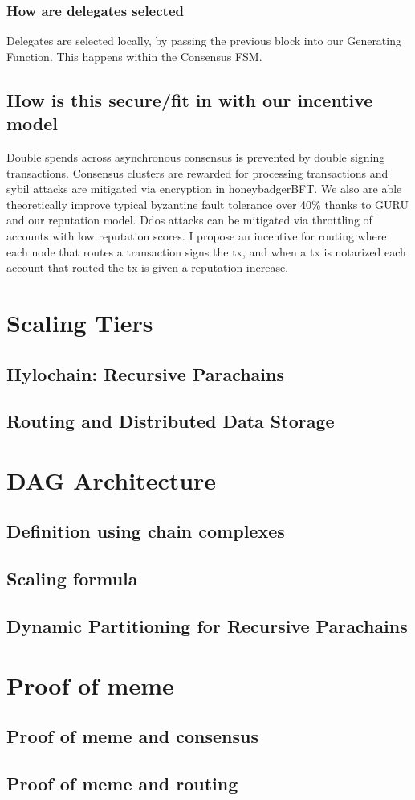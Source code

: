 \documentclass{article}
\begin{document}
\subsubsection{How are delegates selected}
Delegates are selected locally, by passing the previous block into our Generating Function. This happens within the Consensus FSM.

\subsection{How is this secure/fit in with our incentive model}
Double spends across asynchronous consensus is prevented by double signing transactions. Consensus clusters are rewarded for processing transactions and sybil attacks are mitigated via encryption in honeybadgerBFT. We also are able theoretically improve typical byzantine fault tolerance over 40\% thanks to GURU and our reputation model. Ddos attacks can be mitigated via throttling of accounts with low reputation scores. I propose an incentive for routing where each node that routes a transaction signs the tx, and when a tx is notarized each account that routed the tx is given a reputation increase.

\section{Scaling Tiers}
\subsection{Hylochain: Recursive Parachains}
\subsection{Routing and Distributed Data Storage}

\section{DAG Architecture}
\subsection{Definition using chain complexes}
\subsection{Scaling formula}
\subsection{Dynamic Partitioning for Recursive Parachains}


\section{Proof of meme}
\subsection{Proof of meme and consensus}
\subsection{Proof of meme and routing}



\end{document}
